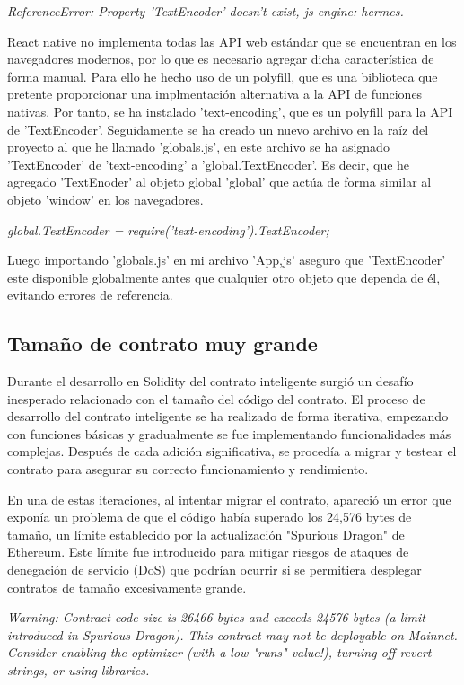 \textit{ReferenceError: Property 'TextEncoder' doesn't exist, js engine: hermes.}

React native no implementa todas las API web estándar que se encuentran en los navegadores modernos, por lo que es necesario agregar dicha característica de forma manual. Para ello he hecho uso de un polyfill, que es una biblioteca que pretente proporcionar una implmentación alternativa a la API de funciones nativas.
Por tanto, se ha instalado 'text-encoding', que es un polyfill para la API de 'TextEncoder'.
Seguidamente se ha creado un nuevo archivo en la raíz del proyecto al que he llamado 'globals.js', en este archivo se ha asignado 'TextEncoder' de 'text-encoding' a 'global.TextEncoder'. Es decir, que he agregado 'TextEnoder' al objeto global 'global' que actúa de forma similar al objeto 'window' en los navegadores.

\textit{global.TextEncoder = require('text-encoding').TextEncoder;}

Luego importando 'globals.js' en mi archivo 'App,js' aseguro que 'TextEncoder' este disponible globalmente antes que cualquier otro objeto que dependa de él, evitando errores de referencia.


\subsection{Tamaño de contrato muy grande}

Durante el desarrollo en Solidity del contrato inteligente surgió un desafío inesperado relacionado con el tamaño del código del contrato.
El proceso de desarrollo del contrato inteligente se ha realizado de forma iterativa, empezando con funciones básicas y gradualmente se fue implementando funcionalidades más complejas. Después de cada adición significativa, se procedía a migrar y testear el contrato para asegurar su correcto funcionamiento y rendimiento.

En una de estas iteraciones, al intentar migrar el contrato, apareció un error que exponía un problema de que el código había superado los 24,576 bytes de tamaño, un límite establecido por la actualización "Spurious Dragon" de Ethereum. Este límite fue introducido para mitigar riesgos de ataques de denegación de servicio (DoS) que podrían ocurrir si se permitiera desplegar contratos de tamaño excesivamente grande.

\textit{Warning: Contract code size is 26466 bytes and exceeds 24576 bytes (a limit introduced in Spurious Dragon). This contract may not be deployable on Mainnet. Consider enabling the optimizer (with a low "runs" value!), turning off revert strings, or using libraries.}


